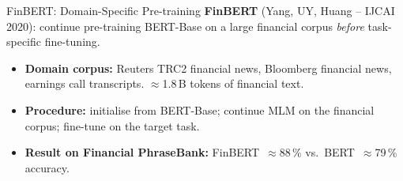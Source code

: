 \documentclass[11pt,aspectratio=169,professionalfonts]{beamer}
\begin{document}
%
%
\begin{frame}{FinBERT: Domain-Specific Pre-training}
  \textbf{FinBERT} (Yang, UY, Huang -- IJCAI 2020):
  continue pre-training BERT-Base on a large financial corpus
  \emph{before} task-specific fine-tuning.

  \begin{itemize}
    \item \textbf{Domain corpus:} Reuters TRC2 financial news,
          Bloomberg financial news, earnings call transcripts.
          $\approx$1.8\,B tokens of financial text.
    \item \textbf{Procedure:} initialise from BERT-Base; continue MLM
          on the financial corpus; fine-tune on the target task.
    \item \textbf{Result on Financial PhraseBank:}
          FinBERT~$\approx$88\,\% vs.\ BERT~$\approx$79\,\% accuracy.
  \end{itemize}

\end{frame}
%
%
\end{document}
